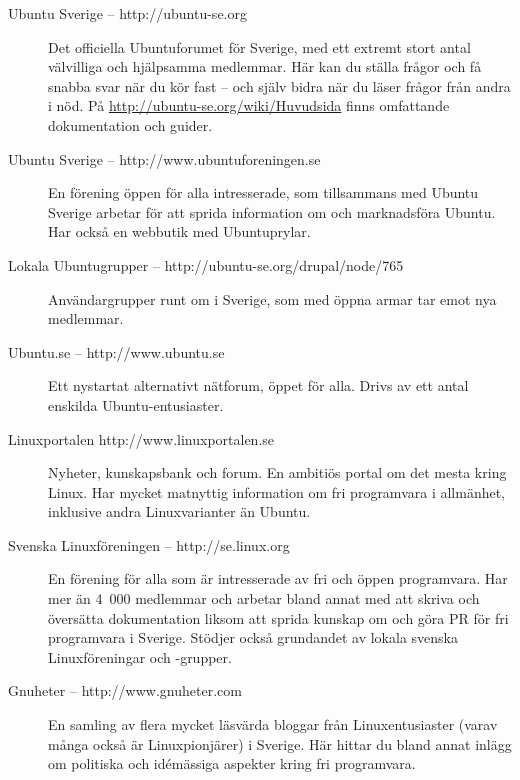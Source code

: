 \documentclass[a4paper,final]{memoir} %
\begin{document}
\begin{description}

\item[Ubuntu Sverige -- http://ubuntu-se.org] Det officiella Ubuntuforumet för Sverige, med ett extremt stort antal välvilliga och hjälpsamma medlemmar. Här kan du ställa frågor och få snabba svar när du kör fast -- och själv bidra när du läser frågor från andra i nöd. På \url{http://ubuntu-se.org/wiki/Huvudsida} finns omfattande dokumentation och guider.

\item[Ubuntu Sverige -- http://www.ubuntuforeningen.se] En förening öppen för alla intresserade, som tillsammans med Ubuntu Sverige arbetar för att sprida information om och marknadsföra Ubuntu. Har också en webbutik med Ubuntuprylar.

\item[Lokala Ubuntugrupper -- http://ubuntu-se.org/drupal/node/765] An\-vän\-dar\-grupper runt om i Sverige, som med öppna armar tar emot nya medlemmar.

\item[Ubuntu.se -- http://www.ubuntu.se] Ett nystartat alternativt nätforum, öppet för alla. Drivs av ett antal enskilda Ubuntu-entusiaster.

\item[Linuxportalen http://www.linuxportalen.se] Nyheter, kunskapsbank och forum. En ambitiös portal om det mesta kring Linux. Har mycket matnyttig information om fri programvara i allmänhet, inklusive andra Linuxvarianter än Ubuntu.

\item[Svenska Linuxföreningen -- http://se.linux.org] En förening för alla som är intresserade av fri och öppen programvara. Har mer än 4~000 medlemmar och arbetar bland annat med att skriva och översätta dokumentation liksom att sprida kunskap om och göra PR för fri programvara i Sverige. Stödjer också grundandet av lokala svenska Linuxföreningar och -grupper.

\item[Gnuheter -- http://www.gnuheter.com] En samling av flera mycket läsvärda bloggar från Linuxentusiaster (varav många också är Linuxpionjärer) i Sverige. Här hittar du bland annat inlägg om politiska och idémässiga aspekter kring fri programvara.

\end{description}

\end{document}
